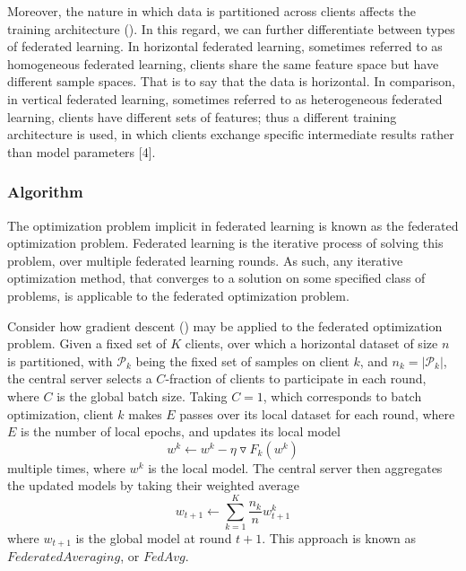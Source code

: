 \documentclass[letterpaper]{article} %
\begin{document}
Moreover, the nature in which data is partitioned across clients affects the training architecture (). In this regard, we can further differentiate between types of federated learning. In horizontal federated learning, sometimes referred to as homogeneous federated learning, clients share the same feature space but have different sample spaces. That is to say that the data is horizontal. In comparison, in vertical federated learning, sometimes referred to as heterogeneous federated learning, clients have different sets of features; thus a different training architecture is used, in which clients exchange specific intermediate results rather than model parameters [4].

\subsubsection{Algorithm}

The optimization problem implicit in federated learning is known as the federated optimization problem. Federated learning is the iterative process of solving this problem, over multiple federated learning rounds. As such, any iterative optimization method, that converges to a solution on some specified class of problems, is applicable to the federated optimization problem. 

Consider how gradient descent () may be applied to the federated optimization problem. Given a fixed set of $K$ clients, over which a horizontal dataset of size $n$ is partitioned, with $\mathcal{P}_k$ being the fixed set of samples on client $k$, and $n_k = |\mathcal{P}_k|$, the central server selects a $C$-fraction of clients to participate in each round, where $C$ is the global batch size. Taking $C=1$, which corresponds to batch optimization, client $k$ makes $E$ passes over its local dataset for each round, where $E$ is the number of local epochs, and updates its local model
\begin{equation}
w^k \leftarrow w^k - \eta \triangledown F_k(w^k)
\end{equation}
multiple times, where $w^k$ is the local model. The central server then aggregates the updated models by taking their weighted average
\begin{equation}
w_{t+1}   \leftarrow \sum_{k=1}^K \frac{n_k}{n} w_{t+1}^k
\end{equation}
where $w_{t+1}$ is the global model at round $t+1$. This approach is known as $Federated Averaging$, or $FedAvg$.
\end{document}
